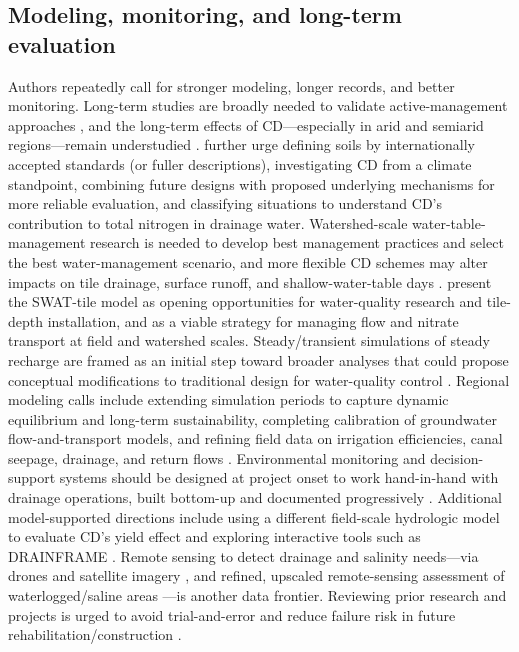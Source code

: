 \documentclass[11pt]{article}
\begin{document}
\subsection{Modeling, monitoring, and long-term evaluation}
Authors repeatedly call for stronger modeling, longer records, and better monitoring. Long-term studies are broadly needed to validate active-management approaches \parencite{Ayars2006b}, and the long-term effects of CD---especially in arid and semiarid regions---remain understudied \parencite{Wang2020c}. \textcite{Wang2020c} further urge defining soils by internationally accepted standards (or fuller descriptions), investigating CD from a climate standpoint, combining future designs with proposed underlying mechanisms for more reliable evaluation, and classifying situations to understand CD's contribution to total nitrogen in drainage water. Watershed-scale water-table-management research is needed to develop best management practices and select the best water-management scenario, and more flexible CD schemes may alter impacts on tile drainage, surface runoff, and shallow-water-table days \parencite{Golmohammadi2016}. \textcite{Kim2023} present the SWAT-tile model as opening opportunities for water-quality research and tile-depth installation, and as a viable strategy for managing flow and nitrate transport at field and watershed scales. Steady/transient simulations of steady recharge are framed as an initial step toward broader analyses that could propose conceptual modifications to traditional design for water-quality control \parencite{GRISMER1993}. Regional modeling calls include extending simulation periods to capture dynamic equilibrium and long-term sustainability, completing calibration of groundwater flow-and-transport models, and refining field data on irrigation efficiencies, canal seepage, drainage, and return flows \parencite{Triana2010}. Environmental monitoring and decision-support systems should be designed at project onset to work hand-in-hand with drainage operations, built bottom-up and documented progressively \parencite{Quinn2009}. Additional model-supported directions include using a different field-scale hydrologic model to evaluate CD's yield effect \parencite{BinShokrana2023} and exploring interactive tools such as DRAINFRAME \parencite{Gopalakrishnan2007}. Remote sensing to detect drainage and salinity needs---via drones and satellite imagery \parencite{Yannopoulos2020}, and refined, upscaled remote-sensing assessment of waterlogged/saline areas \parencite{Gopalakrishnan2007}---is another data frontier. Reviewing prior research and projects is urged to avoid trial-and-error and reduce failure risk in future rehabilitation/construction \parencite{Valipour2014}.
\end{document}
